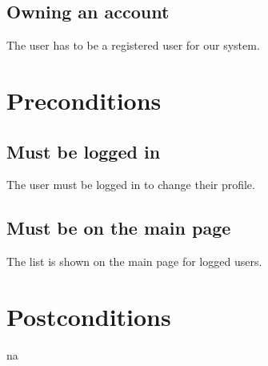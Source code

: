 \documentclass[a4paper,12pt,chapterprefix=false,bibliography=totoc,listof=totoc,book]{scrreprt}
\begin{document}
    \section{Owning an account}
    The user has to be a registered user for our system.

    \chapter{Preconditions}
    \section{Must be logged in}
    The user must be logged in to change their profile.
    \section{Must be on the main page}
    The list is shown on the main page for logged users.
    
    \chapter{Postconditions}
    \gls{na}
\end{document}
